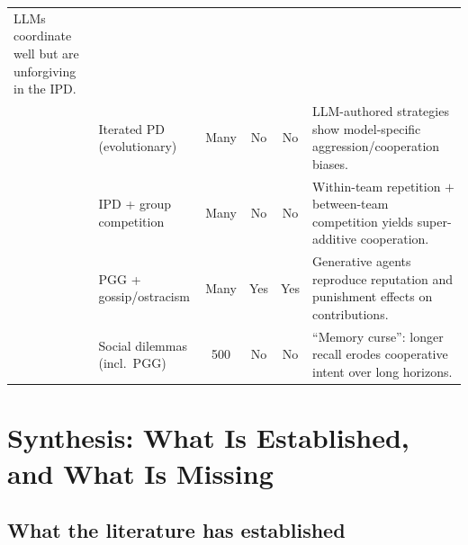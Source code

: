\documentclass[11pt,a4paper]{article}
\begin{document}
\begin{table}[t]
\begin{tabularx}{\textwidth}{@{}p{} p{} c c c Y@{}}
LLMs coordinate well but are unforgiving in the IPD. \\
\citet{willis2025cooperate} & Iterated PD (evolutionary) & Many & No & No &
LLM-authored strategies show model-specific aggression/cooperation biases. \\
\citet{tonini2025superadditive} & IPD + group competition & Many & No & No &
Within-team repetition $+$ between-team competition yields super-additive
cooperation. \\
\citet{cross2025validating} & PGG + gossip/ostracism & Many & Yes & Yes &
Generative agents reproduce reputation and punishment effects on contributions. \\
\citet{liu2026memory} & Social dilemmas (incl.\ PGG) & 500 & No & No &
``Memory curse'': longer recall erodes cooperative intent over long horizons. \\
\bottomrule
\end{tabularx}
\end{table}

\section{Synthesis: What Is Established, and What Is Missing}
\label{sec:synthesis}

\subsection{What the literature has established}
\end{document}
